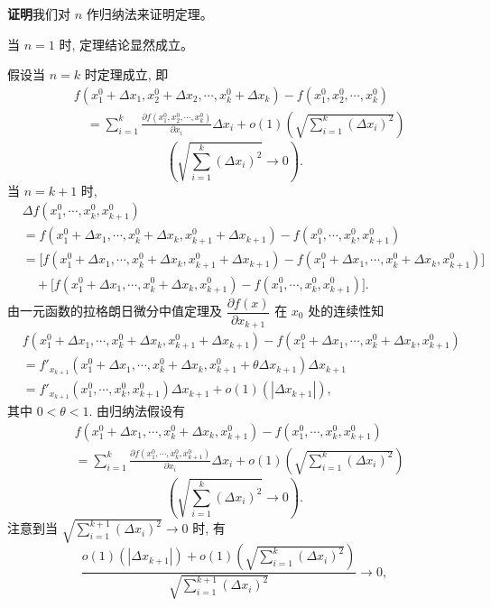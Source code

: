\documentclass[UTF8,12pt,a4paper,fontset=fandol]{ctexart}
\begin{document}
\noindent\textbf{证明}\quad 我们对 $n$ 作归纳法来证明定理。

当 $n=1$ 时, 定理结论显然成立。

假设当 $n=k$ 时定理成立, 即
\[
\begin{aligned}
&f(x_1^0+\Delta x_1,x_2^0+\Delta x_2,\cdots,x_k^0+\Delta x_k)
  -f(x_1^0,x_2^0,\cdots,x_k^0)\\
&\quad =
  \sum_{i=1}^k
  \frac{\partial f(x_1^0,x_2^0,\cdots,x_k^0)}{\partial x_i}\Delta x_i
  +o(1)\left(\sqrt{\sum_{i=1}^k(\Delta x_i)^2}\right)
\end{aligned}
\]
\[
  \left(\sqrt{\sum_{i=1}^k(\Delta x_i)^2}\to0\right).
\]
当 $n=k+1$ 时,
\[
\begin{aligned}
&\Delta f(x_1^0,\cdots,x_k^0,x_{k+1}^0)\\
&=f(x_1^0+\Delta x_1,\cdots,x_k^0+\Delta x_k,x_{k+1}^0+\Delta x_{k+1})
  -f(x_1^0,\cdots,x_k^0,x_{k+1}^0)\\
&=\big[f(x_1^0+\Delta x_1,\cdots,x_k^0+\Delta x_k,x_{k+1}^0+\Delta x_{k+1})
  -f(x_1^0+\Delta x_1,\cdots,x_k^0+\Delta x_k,x_{k+1}^0)\big]\\
&\quad+\big[f(x_1^0+\Delta x_1,\cdots,x_k^0+\Delta x_k,x_{k+1}^0)
  -f(x_1^0,\cdots,x_k^0,x_{k+1}^0)\big].
\end{aligned}
\]
由一元函数的拉格朗日微分中值定理及 $\dfrac{\partial f(x)}{\partial x_{k+1}}$ 在 $x_0$ 处的连续性知
\[
\begin{aligned}
&f(x_1^0+\Delta x_1,\cdots,x_k^0+\Delta x_k,x_{k+1}^0+\Delta x_{k+1})
  -f(x_1^0+\Delta x_1,\cdots,x_k^0+\Delta x_k,x_{k+1}^0)\\
&=f'_{x_{k+1}}(x_1^0+\Delta x_1,\cdots,x_k^0+\Delta x_k,
  x_{k+1}^0+\theta\Delta x_{k+1})\Delta x_{k+1}\\
&=f'_{x_{k+1}}(x_1^0,\cdots,x_k^0,x_{k+1}^0)\Delta x_{k+1}
  +o(1)(|\Delta x_{k+1}|),
\end{aligned}
\tag{14.1.1}
\]
其中 $0<\theta<1$. 由归纳法假设有
\[
\begin{aligned}
&f(x_1^0+\Delta x_1,\cdots,x_k^0+\Delta x_k,x_{k+1}^0)
  -f(x_1^0,\cdots,x_k^0,x_{k+1}^0)\\
&=
\sum_{i=1}^k
\frac{\partial f(x_1^0,\cdots,x_k^0,x_{k+1}^0)}{\partial x_i}\Delta x_i
+o(1)\left(\sqrt{\sum_{i=1}^k(\Delta x_i)^2}\right)
\end{aligned}
\tag{14.1.2}
\]
\[
  \left(\sqrt{\sum_{i=1}^k(\Delta x_i)^2}\to0\right).
\]
注意到当 $\sqrt{\sum\limits_{i=1}^{k+1}(\Delta x_i)^2}\to0$ 时, 有
\[
  \frac{
  o(1)(|\Delta x_{k+1}|)
  +o(1)\left(\sqrt{\sum\limits_{i=1}^k(\Delta x_i)^2}\right)}
  {\sqrt{\sum\limits_{i=1}^{k+1}(\Delta x_i)^2}}\to0,
\]
\end{document}
